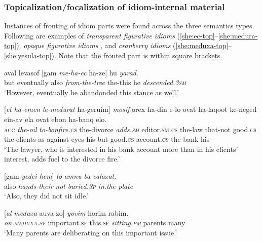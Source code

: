 \documentclass[output=paper]{langsci/langscibook}
\begin{document}
\subsubsection{Topicalization/focalization of idiom-internal material}
\label{she:sec:topicalization}
Instances of fronting of idiom parts were found across the three semantics types. Following are examples of \textit{transparent figurative idioms} (\ref{she:ec-top}--\ref{she:medura-top}), \textit{opaque figurative idioms} , and \textit{cranberry idioms} (\ref{she:meduxa-top}--\ref{she:yesula-top}). Note that the fronted part is within square brackets.

	\ea\label{she:ec-top}
		\gll {\alef}aval levasof \textnormal{[}gam \textit{me-ha-{\ayin}ec} ha-ze\textnormal{]} hu \textit{yarad}.\\
		  but eventually also \textit{from-the-tree} the-this he \textit{descended.\textsc{3sm}}\\
		\glt `However, eventually he abandonded this stance as well.'
	\z
	
    \ea\label{she:medura-top}
        \gll \textnormal{[}\textit{{\alef}et} \textit{ha-{\shin}emen} \textit{le-medurat} ha-geru{\shin}im\textnormal{]} \textit{mosif} {\ayin}orex ha-din {\shin}e-lo {\tet}ovat ha-laqo{\het}ot ke-neged {\ayin}ein-av {\alef}ela {\tet}ovat {\het}e{\shin}bon ha-banq {\shin}elo.\\
            \textsc{acc} \textit{the-oil} \textit{to-bonfire.\textsc{cs}} the-divorce \textit{adds.\textsc{sm}} editor.\textsc{sm}.\textsc{cs} the-law that-not good.\textsc{cs} the-clients as-against eyes-his but good.\textsc{cs} account.\textsc{cs} the-bank his\\
        \glt `The lawyer, who is interested in his bank account more than in his clients' interest, adds fuel to the divorce fire.'
    \z

	
	\ea\label{she:taman-top}
		\gll \textnormal{[}gam \textit{yedei-hem}\textnormal{]} \textit{lo} \textit{{\tet}amnu} \textit{ba-calaxat}.\\
		also \textit{hands-their} \textit{not} \textit{buried.\textsc{3p}} \textit{in.the-plate}\\
		\glt `Also, they did not sit idle.'
	\z
	
    \ea\label{she:meduxa-top}
        \gll \textnormal{[}\textit{{\ayin}al} \textit{meduxa} {\het}a{\shin}uva zo\textnormal{]} \textit{yo{\shin}vim} horim rabim.\\
                  \textit{on} \textit{\textsc{meduxa}.\textsc{sf}} important.\textsc{sf} this.\textsc{sf} \textit{sitting.\textsc{pm}} parents many\\
        \glt `Many parents are deliberating on this important issue.'
    \z
\end{document}
